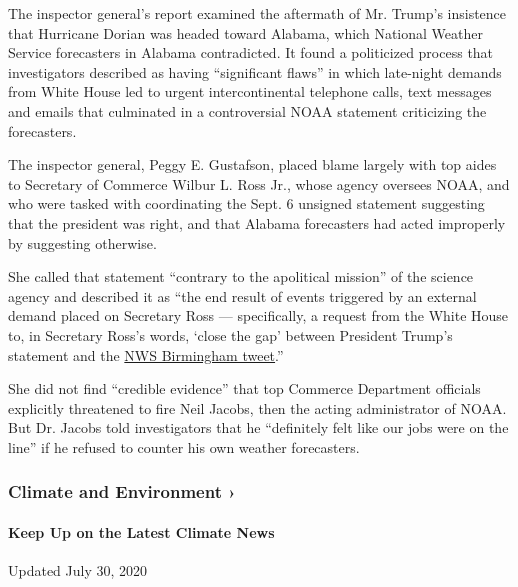 The inspector general's report examined the aftermath of Mr. Trump's
insistence that Hurricane Dorian was headed toward Alabama, which
National Weather Service forecasters in Alabama contradicted. It found a
politicized process that investigators described as having ``significant
flaws'' in which late-night demands from White House led to urgent
intercontinental telephone calls, text messages and emails that
culminated in a controversial NOAA statement criticizing the
forecasters.

The inspector general, Peggy E. Gustafson, placed blame largely with top
aides to Secretary of Commerce Wilbur L. Ross Jr., whose agency oversees
NOAA, and who were tasked with coordinating the Sept. 6 unsigned
statement suggesting that the president was right, and that Alabama
forecasters had acted improperly by suggesting otherwise.

She called that statement ``contrary to the apolitical mission'' of the
science agency and described it as ``the end result of events triggered
by an external demand placed on Secretary Ross --- specifically, a
request from the White House to, in Secretary Ross's words, `close the
gap' between President Trump's statement and the
\href{https://www.nytimes.com/2019/11/07/climate/trump-alabama-sharpie-hurricane.html}{NWS
Birmingham tweet}.''

She did not find ``credible evidence'' that top Commerce Department
officials explicitly threatened to fire Neil Jacobs, then the acting
administrator of NOAA. But Dr. Jacobs told investigators that he
``definitely felt like our jobs were on the line'' if he refused to
counter his own weather forecasters.

\href{https://www.nytimes.com/section/climate?action=click\&pgtype=Article\&state=default\&region=MAIN_CONTENT_1\&context=storylines_keepup}{}

\hypertarget{climate-and-environment-}{%
\subsubsection{Climate and Environment
›}\label{climate-and-environment-}}

\hypertarget{keep-up-on-the-latest-climate-news}{%
\paragraph{Keep Up on the Latest Climate
News}\label{keep-up-on-the-latest-climate-news}}

Updated July 30, 2020

